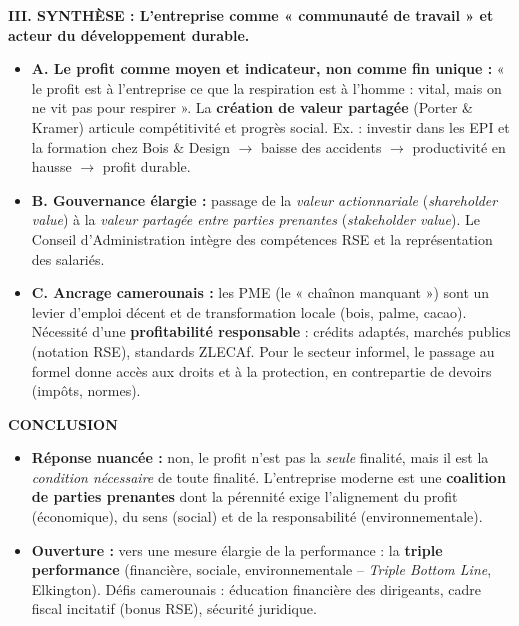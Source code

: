\documentclass[11pt]{article}
\begin{document}
\begin{corrige}
\textbf{III. SYNTHÈSE : L'entreprise comme « communauté de travail » et acteur du développement durable.}
\begin{itemize}
    \item \textbf{A. Le profit comme \textbf{moyen} et \textbf{indicateur}, non comme fin unique :} « le profit est à l'entreprise ce que la respiration est à l'homme : vital, mais on ne vit pas pour respirer ». La \textbf{création de valeur partagée} (Porter \& Kramer) articule compétitivité et progrès social. Ex. : investir dans les EPI et la formation chez Bois \& Design $\rightarrow$ baisse des accidents $\rightarrow$ productivité en hausse $\rightarrow$ profit durable.
    \item \textbf{B. Gouvernance élargie :} passage de la \emph{valeur actionnariale} (\emph{shareholder value}) à la \emph{valeur partagée entre parties prenantes} (\emph{stakeholder value}). Le Conseil d'Administration intègre des compétences RSE et la représentation des salariés.
    \item \textbf{C. Ancrage camerounais :} les PME (le « chaînon manquant ») sont un levier d'emploi décent et de transformation locale (bois, palme, cacao). Nécessité d'une \textbf{profitabilité responsable} : crédits adaptés, marchés publics (notation RSE), standards ZLECAf. Pour le secteur informel, le passage au formel donne accès aux droits et à la protection, en contrepartie de devoirs (impôts, normes).
\end{itemize}

\textbf{CONCLUSION}
\begin{itemize}
    \item \textbf{Réponse nuancée :} non, le profit n'est pas la \emph{seule} finalité, mais il est la \emph{condition nécessaire} de toute finalité. L'entreprise moderne est une \textbf{coalition de parties prenantes} dont la pérennité exige l'alignement du profit (économique), du sens (social) et de la responsabilité (environnementale).
    \item \textbf{Ouverture :} vers une mesure élargie de la performance : la \textbf{triple performance} (financière, sociale, environnementale -- \emph{Triple Bottom Line}, Elkington). Défis camerounais : éducation financière des dirigeants, cadre fiscal incitatif (bonus RSE), sécurité juridique.
\end{itemize}
\end{corrige}
\end{document}
